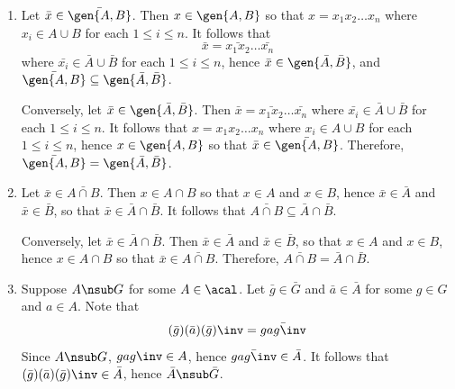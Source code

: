 \begin{sol}
\begin{enumerate}
        Suppose $bA \in \ker\psi$.
        Then $\psi(bA) = \bar A$ so that $\bar b \bar A = \bar A$.
        Then $\bar b \in \bar A$, hence $bN \in A/N$, and $b \in A$.
        Then $bA = A$ which is the identity in $B/A$ so that $\ker\psi = 1$, hence $\psi$ is injective.
        To show that $\psi$ is surjective, let $\bar b \bar A \in \bar B/\bar A$ for $\bar b \in B$.
        By definition of $\bar B$, there exists $b \in B$ such that $\bar b = bN$.
        Then $\psi(bA) = \bar b \bar A$, hence $\psi$ is surjective.
        Lastly, for any $b_1A, b_2A \in B/A$,
        \[
        	\psi(b_1A \cdot b_2A) = \psi(b_1b_2A) = \bar{b_1b_2} \bar A = \bar b_1 \bar b_2 \bar A = \psi(b_1A) \cdot \psi(b_2A)
        \]
        so that $\psi$ is a homomorphism.
        Therefore, $\psi$ is an isomorphism and $\abs{B : A} = \abs{B/A} = \abs{\bar B / \bar A} = \abs{\bar B : \bar A}$.
        \item Let $\bar x \in \bar{\gen{A, B}}$.
        Then $x \in \gen{A, B}$ so that $x = x_1x_2 \ldots x_n$ where $x_i \in A \cup B$ for each $1 \leq i \leq n$.
        It follows that
        \[
        	\bar x = \bar{x_1x_2} \ldots \bar{x_n}
        \]
        where $\bar{x_i} \in \bar A \cup \bar B$ for each $1 \leq i \leq n$, hence $\bar x \in \gen{\bar A, \bar B}$, and $\bar{\gen{A, B}} \subseteq \gen{\bar A, \bar B}$. 
        
        Conversely, let $\bar x \in \gen{\bar A, \bar B}$.
        Then $\bar x = \bar{x_1x_2} \ldots \bar{x_n}$ where $\bar{x_i} \in \bar A \cup \bar B$ for each $1 \leq i \leq n$.
        It follows that $x = x_1x_2 \ldots x_n$ where $x_i \in A \cup B$ for each $1 \leq i \leq n$, hence $x \in \gen{A, B}$ so that $\bar x \in \bar{\gen{A, B}}$.
        Therefore, $\bar{\gen{A, B}} = \gen{\bar A, \bar B}$.
        \item Let $\bar x \in \bar{A \cap B}$.
        Then $x \in A \cap B$ so that $x \in A$ and $x \in B$, hence $\bar x \in \bar A$ and $\bar x \in \bar B$, so that $\bar x \in \bar A \cap \bar B$.
        It follows that $\bar{A \cap B} \subseteq \bar A \cap \bar B$.
            
        Conversely, let $\bar x \in \bar A \cap \bar B$.
        Then $\bar x \in \bar A$ and $\bar x \in \bar B$, so that $x \in A$ and $x \in B$, hence $x \in A \cap B$ so that $\bar x \in \bar{A \cap B}$.
        Therefore, $\bar{A \cap B} = \bar A \cap \bar B$.
        \item \rightimp Suppose $A \nsub G$ for some $A \in \acal$.
	    Let $\bar g \in \bar G$ and $\bar a \in \bar A$ for some $g \in G$ and $a \in A$.
	    Note that
        \[
            (\bar g)(\bar a)(\bar g)\inv = \bar{gag\inv}
        \]
        Since $A \nsub G$, $gag\inv \in A$, hence $\bar{gag\inv} \in \bar A$.
	    It follows that $(\bar g)(\bar a)(\bar g)\inv \in \bar A$, hence $\bar A \nsub \bar G$.
        

\end{enumerate}
\end{sol}
